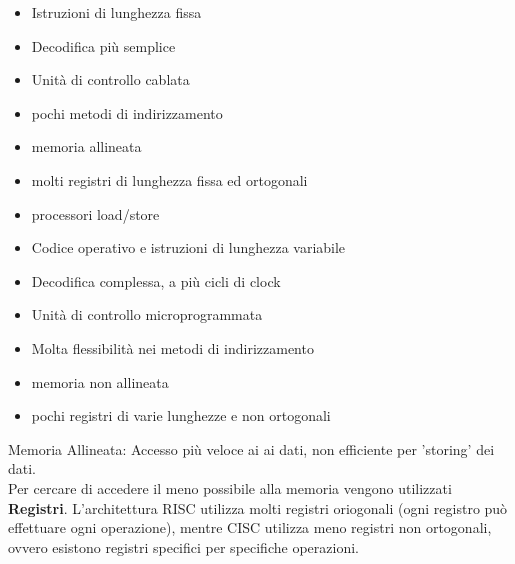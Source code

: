 \documentclass[../ace.tex]{subfiles}
\begin{document}
\vspace{10pt}
\noindent\begin{minipage}{.48\textwidth}
    \begin{tcolorbox}[title={\centering RISC}]
        \begin{itemize}[leftmargin=*]
            \item Istruzioni di lunghezza fissa
            \item Decodifica più semplice
            \item Unità di controllo cablata
            \item pochi metodi di indirizzamento
            \item memoria allineata
            \item molti registri di lunghezza fissa ed ortogonali
            \item processori load/store
        \end{itemize}
    \end{tcolorbox}
\end{minipage}
\begin{minipage}{.51\textwidth}
    \begin{tcolorbox}[title={\centering CISC}]
        \begin{itemize}[leftmargin=*]
            \item Codice operativo e istruzioni di lunghezza variabile
            \item Decodifica complessa, a più cicli di clock
            \item Unità di controllo microprogrammata
            \item Molta flessibilità nei metodi di indirizzamento
            \item memoria non allineata
            \item pochi registri di varie lunghezze e non ortogonali
        \end{itemize}
    \end{tcolorbox}
\end{minipage}
\vspace{10pt}

Memoria Allineata: Accesso più veloce ai ai dati, non efficiente per 'storing' dei dati.
\\
Per cercare di accedere il meno possibile alla memoria vengono utilizzati \textbf{Registri}.
L'architettura RISC utilizza molti registri oriogonali (ogni registro può effettuare ogni operazione),
mentre CISC utilizza meno registri non ortogonali, ovvero esistono registri specifici per specifiche operazioni.
\end{document}

